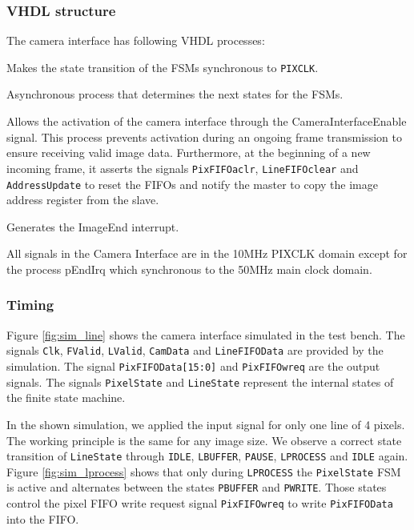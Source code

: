 \documentclass{article}
\begin{document}
\subsubsection{VHDL structure}
The camera interface has following VHDL processes:
\begin{description}[align=right, leftmargin=*,labelindent=3cm]
\item[pStateTransition] Makes the state transition of the FSMs synchronous to \verb'PIXCLK'.
\item[pNextStateLogic] Asynchronous process that determines the next states for the FSMs.
\item[pActive] Allows the activation of the camera interface through the CameraInterfaceEnable signal. This process prevents activation during an ongoing frame transmission to ensure receiving valid image data. Furthermore, at the beginning of a new incoming frame, it asserts the signals \verb'PixFIFOaclr', \verb'LineFIFOclear' and \verb'AddressUpdate' to reset the FIFOs and notify the master to copy the image address register from the slave.
\item[pEndIrq] Generates the ImageEnd interrupt.
\end{description}

All signals in the Camera Interface are in the 10MHz PIXCLK domain except for the process pEndIrq which synchronous to the 50MHz main clock domain.

\subsubsection{Timing}

Figure \ref{fig:sim_line} shows the camera interface simulated in the test bench. The signals \verb'Clk', \verb'FValid', \verb'LValid', \verb'CamData' and \verb'LineFIFOData' are provided by the simulation. The signal \verb'PixFIFOData[15:0]' and \verb'PixFIFOwreq' are the output signals. The signals \verb'PixelState' and \verb'LineState' represent the internal states of the finite state machine.

In the shown simulation, we applied the input signal for only one line of 4 pixels. The working principle is the same for any image size. 
We observe a correct state transition of \verb'LineState' through \verb'IDLE', \verb'LBUFFER', \verb'PAUSE', \verb'LPROCESS' and \verb'IDLE' again.
Figure \ref{fig:sim_lprocess} shows that only during \verb'LPROCESS' the \verb'PixelState' FSM is active and alternates between the states \verb'PBUFFER' and \verb'PWRITE'. Those states control the pixel FIFO write request signal \verb'PixFIFOwreq' to write \verb'PixFIFOData' into the FIFO.
\end{document}

